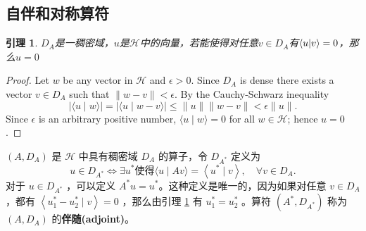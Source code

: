 \documentclass[hyperref,UTF8]{ctexbook}
\newtheorem{lemma}[theorem]{引理}
\begin{document}
\subsection{自伴和对称算符}
\begin{lemma}\label{lema:13.20}
    \(D_A\)是一稠密域，\(u\)是\(\mathcal{H}\)中的向量，若能使得对任意\(v \in D_A\)有\(\braket{u|v}=0\)，那么\(u=0\)
\end{lemma}
\begin{proof}
    Let \(w\) be any vector in \(\mathcal{H}\) and \(\epsilon>0\). Since \(D_{A}\) is dense there exists a vector \(v \in D_{A}\) such that \(\|w-v\|<\epsilon\). By the Cauchy-Schwarz inequality
\[
|\langle u \mid w\rangle|=|\langle u \mid w-v\rangle| \leq\|u\|\|w-v\|<\epsilon\|u\| .
\]
Since \(\epsilon\) is an arbitrary positive number, \(\langle u \mid w\rangle=0\) for all \(w \in \mathcal{H}\); hence \(u=0\).\qedhere
\end{proof}
\(\left(A, D_{A}\right)\) 是 \(\mathcal{H}\) 中具有稠密域 \(D_{A}\) 的算子，令 \(D_{A^ {*}}\) 定义为
\[
u \in D_{A^{*}} \Longleftrightarrow \exists u^{*} \text {使得}\langle u \mid A v\rangle=\left\langle u^{*} \mid v\right\rangle, \quad \forall v \in D_{A} .
\]
对于 \(u \in D_{A^{*}}\) ，可以定义 \(A^{*} u=u^{*}\)。这种定义是唯一的，因为如果对任意 \(v \in D_{ A}\)，都有 \(\left\langle u_{1}^{*}-u_{2}^{*} \mid v\right\rangle=0\) ，那么由引理 \ref{lema:13.20} 有 \(u_{1}^{*}=u_{2}^{*}\) 。算符 \(\left(A^{*}, D_{A^{*}}\right)\) 称为 \(\left(A, D_{A}\right)\) 的\textbf{伴随(adjoint)}。
\end{document}
